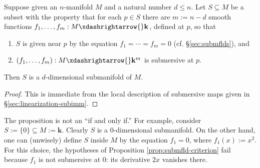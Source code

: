 \documentclass[reqno]{amsart} 
\begin{document}
\begin{proposition}\label{prop:submfld-criterion}
  Suppose given an $n$-manifold $M$
  and a natural number $d \leq n$.
  Let $S \subseteq M$ be a subset with the property
  that for each $p \in S$
  there are $m := n - d$ smooth functions
  $f_1,\dotsc,f_m : M \xdashrightarrow{} \mathbf{k}$, defined at
  $p$, so that
  \begin{enumerate}
  \item $S$ is given near $p$ by the equation
    $f_1 = \dotsb = f_m = 0$ (cf. \S\ref{sec:submflds}), and
  \item $(f_1,\dotsc,f_m) : M \xdashrightarrow{} \mathbf{k}^m$ is
    submersive at $p$.
  \end{enumerate}
  Then $S$ is a $d$-dimensional submanifold of $M$.
\end{proposition}
\begin{proof}
  This is immediate from the local description of submersive maps given in \S\ref{sec:linearization-subimm}.
\end{proof}


\begin{remark}
  The proposition is not an ``if and only if.''
  For example, consider $S := \{0\} \subseteq M := \mathbf{k}$.
  Clearly $S$ is a $0$-dimensional submanifold.
  On the other hand, one can (unwisely) define
  $S$ inside $M$ by the equation $f_1 = 0$,
  where $f_1(x) := x^2$.
  For this choice, the hypotheses of Proposition \ref{prop:submfld-criterion} fail
  because $f_1$ is not submersive at $0$: its derivative $2 x$ vanishes there.
\end{remark}
\end{document}
